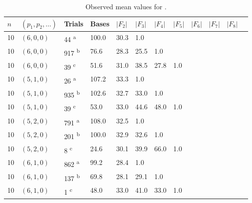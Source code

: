 \begin{table*}[ht]
  \centering
  \caption{Observed mean values for .}
  \label{tab:coarsening}
  \begin{threeparttable}
    \begin{tabular}{llllllllllll}
      \toprule
      $n$ & $(p_1, p_2, \ldots)$ & Trials                  & Bases & $|F_2|$ & $|F_3|$ & $|F_4|$ & $|F_5|$ & $|F_6|$ & $|F_7|$ & $|F_8|$ \\
      \midrule
      10  & $(6, 0, 0)$          & 44 \textsuperscript{a}  & 100.0 & 30.3    & 1.0     &         &         &         &         &         \\
      10  & $(6, 0, 0)$          & 917 \textsuperscript{b} & 76.6  & 28.3    & 25.5    & 1.0     &         &         &         &         \\
      10  & $(6, 0, 0)$          & 39 \textsuperscript{c}  & 51.6  & 31.0    & 38.5    & 27.8    & 1.0     &         &         &         \\
      10  & $(5, 1, 0)$          & 26 \textsuperscript{a}  & 107.2 & 33.3    & 1.0     &         &         &         &         &         \\
      10  & $(5, 1, 0)$          & 935 \textsuperscript{b} & 102.6 & 32.7    & 33.0    & 1.0     &         &         &         &         \\
      10  & $(5, 1, 0)$          & 39 \textsuperscript{c}  & 53.0  & 33.0    & 44.6    & 48.0    & 1.0     &         &         &         \\
      10  & $(5, 2, 0)$          & 791 \textsuperscript{a} & 108.0 & 32.5    & 1.0     &         &         &         &         &         \\
      10  & $(5, 2, 0)$          & 201 \textsuperscript{b} & 100.0 & 32.9    & 32.6    & 1.0     &         &         &         &         \\
      10  & $(5, 2, 0)$          & 8 \textsuperscript{c}   & 24.6  & 30.1    & 39.9    & 66.0    & 1.0     &         &         &         \\
      10  & $(6, 1, 0)$          & 862 \textsuperscript{a} & 99.2  & 28.4    & 1.0     &         &         &         &         &         \\
      10  & $(6, 1, 0)$          & 137 \textsuperscript{b} & 69.8  & 28.1    & 29.1    & 1.0     &         &         &         &         \\
      10  & $(6, 1, 0)$          & 1 \textsuperscript{c}   & 48.0  & 33.0    & 41.0    & 33.0    & 1.0     &         &         &         \\

\end{tabular}
\end{threeparttable}
\end{table*}
